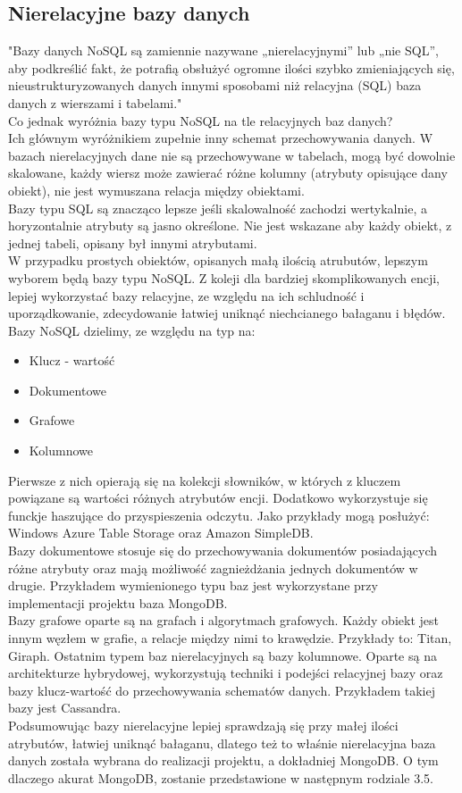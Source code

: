 \documentclass[12pt]{article}
\begin{document}
\begin{sloppypar}
{\subsection{Nierelacyjne bazy danych}
{
  "Bazy danych NoSQL są zamiennie nazywane „nierelacyjnymi” lub „nie SQL”, aby podkreślić fakt, że potrafią obsłużyć ogromne ilości szybko zmieniających się, 
  nieustrukturyzowanych danych innymi sposobami niż relacyjna (SQL) baza danych z wierszami i tabelami." \cite{mc-nosql}\\
  Co jednak wyróżnia bazy typu NoSQL na tle relacyjnych baz danych?\\
  Ich głównym wyróżnikiem zupełnie inny schemat przechowywania danych. W bazach nierelacyjnych dane nie są przechowywane w tabelach, mogą być dowolnie skalowane, 
  każdy wiersz może zawierać różne kolumny (atrybuty opisujące dany obiekt), nie jest wymuszana relacja między obiektami.\\
  Bazy typu SQL są znacząco lepsze jeśli skalowalność zachodzi wertykalnie, a horyzontalnie atrybuty są jasno określone. Nie jest wskazane aby każdy obiekt, z jednej 
  tabeli, opisany był innymi atrybutami.\\
  W przypadku prostych obiektów, opisanych małą ilością atrubutów, lepszym wyborem będą bazy typu NoSQL. Z koleji dla bardziej skomplikowanych encji, lepiej wykorzystać 
  bazy relacyjne, ze względu na ich schludność i uporządkowanie, zdecydowanie łatwiej uniknąć niechcianego bałaganu i błędów.\\
  Bazy NoSQL dzielimy, ze względu na typ na\cite{agh-nosql}:
  \begin{itemize}
    \item Klucz - wartość
    \item Dokumentowe
    \item Grafowe
    \item Kolumnowe
  \end{itemize}
  Pierwsze z nich opierają się na kolekcji słowników, w których z kluczem powiązane są wartości różnych atrybutów encji. Dodatkowo wykorzystuje się funckje haszujące 
  do przyspieszenia odczytu. Jako przykłady mogą posłużyć: Windows Azure Table Storage oraz Amazon SimpleDB.\\
  Bazy dokumentowe stosuje się do przechowywania dokumentów posiadających różne atrybuty oraz mają możliwość zagnieżdżania jednych dokumentów w drugie. Przykładem 
  wymienionego typu baz jest wykorzystane przy implementacji projektu baza MongoDB.\\
  Bazy grafowe oparte są na grafach i algorytmach grafowych. Każdy obiekt jest innym węzłem w grafie, a relacje między nimi to krawędzie. Przykłady to: Titan, Giraph.
  Ostatnim typem baz nierelacyjnych są bazy kolumnowe. Oparte są na architekturze hybrydowej, wykorzystują techniki i podejści relacyjnej bazy oraz bazy klucz-wartość 
  do przechowywania schematów danych. Przykładem takiej bazy jest Cassandra.\\
  Podsumowując bazy nierelacyjne lepiej sprawdzają się przy małej ilości atrybutów, łatwiej uniknąć bałaganu, dlatego też to właśnie nierelacyjna baza danych została wybrana 
  do realizacji projektu, a dokładniej MongoDB. O tym dlaczego akurat MongoDB, zostanie przedstawione w następnym rodziale 3.5.
}
}
\end{sloppypar}
\end{document}
